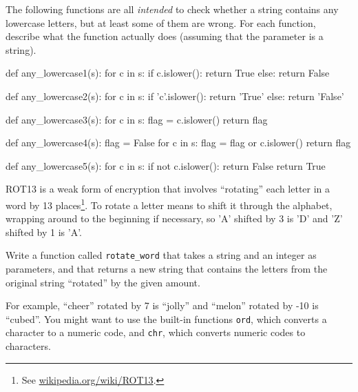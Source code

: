 \begin{exercise}
The following functions are all {\em intended} to check whether a
string contains any lowercase letters, but at least some of them are
wrong.  For each function, describe what the function actually does
(assuming that the parameter is a string).

\begin{pyexo}
def any_lowercase1(s):
    for c in s:
        if c.islower():
            return True
        else:
            return False
\end{pyexo}

\begin{pyexo}
def any_lowercase2(s):
    for c in s:
        if 'c'.islower():
            return 'True'
        else:
            return 'False'
\end{pyexo}

\begin{pyexo}
def any_lowercase3(s):
    for c in s:
        flag = c.islower()
    return flag
\end{pyexo}

\begin{pyexo}
def any_lowercase4(s):
    flag = False
    for c in s:
        flag = flag or c.islower()
    return flag
\end{pyexo}

\begin{pyexo}
def any_lowercase5(s):
    for c in s:
        if not c.islower():
            return False
    return True
\end{pyexo}

\end{exercise}


\begin{exercise}

\label{exrotate}
ROT13 is a weak form of encryption that involves ``rotating'' each
letter in a word by 13 places\footnote{See
  \url{wikipedia.org/wiki/ROT13}.}.  To rotate a letter means
to shift it through the alphabet, wrapping around to the beginning if
necessary, so 'A' shifted by 3 is 'D' and 'Z' shifted by 1 is 'A'.

Write a function called \verb"rotate_word"
that takes a string and an integer as parameters, and that returns
a new string that contains the letters from the original string
``rotated'' by the given amount.  

For example, ``cheer'' rotated by 7 is ``jolly'' and ``melon'' rotated
by -10 is ``cubed''.  
%
%
You might want to use the built-in functions {\tt ord}, which converts
a character to a numeric code, and {\tt chr}, which converts numeric
codes to characters.
%
\end{exercise}
